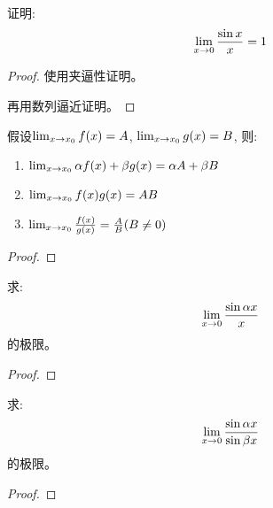 \documentclass[lang=cn]{elegantbook}
\begin{document}
\begin{proposition}
    证明: 
    \[ \lim_{x \to 0 } \frac{\sin x}{x} = 1 \]
\end{proposition}
\begin{proof}
    使用夹逼性证明。

    再用数列逼近证明。
\end{proof}

\begin{theorem}[函数极限四则运算]
    假设$\lim_{x \to x_0 } f(x) = A$, $\lim_{x \to x_0 } g(x) = B$, 则: 
    \begin{enumerate}
        \item $\lim_{x \to x_0 } \alpha f(x) + \beta g(x) = \alpha A + \beta B$
        \item $\lim_{x \to x_0 } f(x)g(x) = AB$
        \item $\lim_{x \to x_0 } \frac{f(x)}{g(x)} = \frac{A}{B}(B \neq 0)$
    \end{enumerate}
\end{theorem}
\begin{proof}
    
\end{proof}

\begin{proposition}
    求:
    \[ \lim_{x \to 0 } \frac{\sin \alpha x}{x} \]
    的极限。
\end{proposition}
\begin{proof}
\end{proof}

\begin{proposition}
    求:
    \[ \lim_{x \to 0 } \frac{\sin \alpha x}{\sin \beta x} \]
    的极限。
\end{proposition}
\begin{proof}
    
\end{proof}

\end{document}
